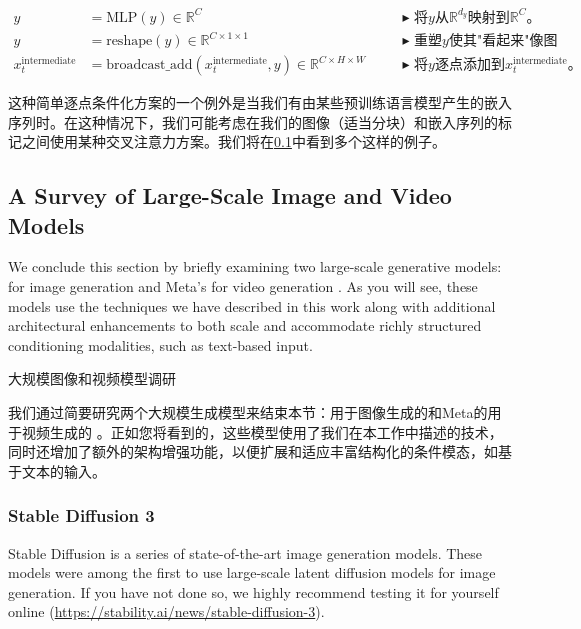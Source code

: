 \begin{align*}
    y &= \text{MLP}(y) \in \mathbb{R}^C\quad 
    && \blacktriangleright\,\,\text{将$y$从$\mathbb{R}^{d_y}$映射到$\mathbb{R}^C$。}\\
    y &= \text{reshape}(y) \in \mathbb{R}^{C \times 1 \times 1}\quad 
    && \blacktriangleright\,\,\text{重塑$y$使其"看起来"像图像。}\\
    x^{\text{intermediate}}_t &= \text{broadcast\_add}(x^{\text{intermediate}}_t,y) \in \mathbb{R}^{C \times H \times W}\quad && \blacktriangleright\,\,\text{将$y$逐点添加到$x^{\text{intermediate}}_t$。}
\end{align*}

这种简单逐点条件化方案的一个例外是当我们有由某些预训练语言模型产生的嵌入序列时。在这种情况下，我们可能考虑在我们的图像（适当分块）和嵌入序列的标记之间使用某种交叉注意力方案。我们将在\cref{sec:large_scale_models}中看到多个这样的例子。

\subsection{A Survey of Large-Scale Image and Video Models}

\label{sec:large_scale_models}
We conclude this section by briefly examining two large-scale generative models:  for image generation and Meta's  for video generation \citep{sd3, moviegen}. As you will see, these models use the techniques we have described in this work along with additional architectural enhancements to both scale and accommodate richly structured conditioning modalities, such as text-based input.

大规模图像和视频模型调研

我们通过简要研究两个大规模生成模型来结束本节：用于图像生成的和Meta的用于视频生成的 \citep{sd3, moviegen}。正如您将看到的，这些模型使用了我们在本工作中描述的技术，同时还增加了额外的架构增强功能，以便扩展和适应丰富结构化的条件模态，如基于文本的输入。

\subsubsection{Stable Diffusion 3}

Stable Diffusion is a series of state-of-the-art image generation models. These models were among the first to use large-scale latent diffusion models for image generation. If you have not done so, we highly recommend testing it for yourself online (\url{https://stability.ai/news/stable-diffusion-3}).\\


